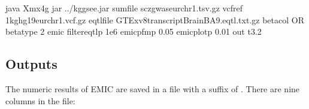 \documentclass[letterpaper,10pt,english,openany,oneside]{sphinxmanual}
\begin{document}
\begin{sphinxVerbatim}[commandchars=\\\{\}]
java \PYGZhy{}Xmx4g \PYGZhy{}jar ../kggsee.jar 
  \PYGZhy{}\PYGZhy{}sum\PYGZhy{}file scz\PYGZus{}gwas\PYGZus{}eur\PYGZus{}chr1.tsv.gz 
  \PYGZhy{}\PYGZhy{}vcf\PYGZhy{}ref 1kg\PYGZus{}hg19\PYGZus{}eur\PYGZus{}chr1.vcf.gz 
  \PYGZhy{}\PYGZhy{}eqtl\PYGZhy{}file GTEx\PYGZus{}v8\PYGZus{}transcript\PYGZus{}BrainBA9.eqtl.txt.gz 
  \PYGZhy{}\PYGZhy{}beta\PYGZhy{}col OR 
  \PYGZhy{}\PYGZhy{}beta\PYGZhy{}type 2 
  \PYGZhy{}\PYGZhy{}emic 
  \PYGZhy{}\PYGZhy{}filter\PYGZhy{}eqtl\PYGZhy{}p 1e\PYGZhy{}6 
  \PYGZhy{}\PYGZhy{}emic\PYGZhy{}pfm\PYGZhy{}p 0.05 
  \PYGZhy{}\PYGZhy{}emic\PYGZhy{}plot\PYGZhy{}p 0.01 
  \PYGZhy{}\PYGZhy{}out t3.2
\end{sphinxVerbatim}


\subsection{Outputs}
\label{\detokenize{detailed_document:id8}}
\sphinxAtStartPar
The numeric results of EMIC are saved in a file with a suffix of . There are nine columns in the file:
\end{document}

